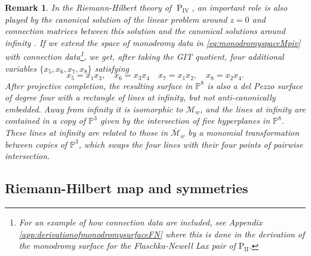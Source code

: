 \documentclass[a4paper,reqno]{amsart}
\numberwithin{equation}{section}
\newcommand\Ptwo{\textrm{P}_{\textrm{II}} }
\newcommand{\p}{\mathbb{P}}
\newcommand{\pain}[1]{\operatorname{P}_{\mathrm{#1}}}
\newtheorem{remark}[theorem]{Remark}
\numberwithin{equation}{section}
\begin{document}
\begin{remark} \label{rem:includeconnection}
    In the Riemann-Hilbert theory of $\pain{IV}$, an important role is also played by the canonical solution of the linear problem around $z=0$ and connection matrices between this solution and the canonical solutions around infinity \cite{fokas}. 
    If we extend the space of monodromy data in \eqref{eq:monodromyspaceMpiv} with connection data\footnote{For an example of how connection data are included, see Appendix \ref{app:derivationofmonodromysurfaceFN} where this is done in the derivation of the monodromy surface for the Flaschka-Newell Lax pair of $\Ptwo$.}, we get, after taking the GIT quotient, four additional variables $\{x_5,x_6,x_7,x_8\}$ satisfying
    \begin{equation*}
        x_5= x_1x_3,\quad x_6 = x_3 x_4\quad x_7 =x_1 x_2,\quad x_8 = x_2 x_4.
    \end{equation*}
 After projective completion, the resulting surface in $\p^8$ is also a del Pezzo surface of degree four with a rectangle of lines at infinity, but not anti-canonically embedded.
 Away from infinity it is isomorphic to $\mathcal{M}_w$, and the lines at infinity are contained in a copy of $\p^3$ given by the intersection of five hyperplanes in $\p^8$. 
 These lines at infinity are related to those in $\overline{\mathcal{M}}_w$ by a monomial transformation between copies of $\p^3$, which swaps the four lines with their four points of pairwise intersection.
\end{remark}









\subsection{Riemann-Hilbert map and symmetries}
\end{document}
